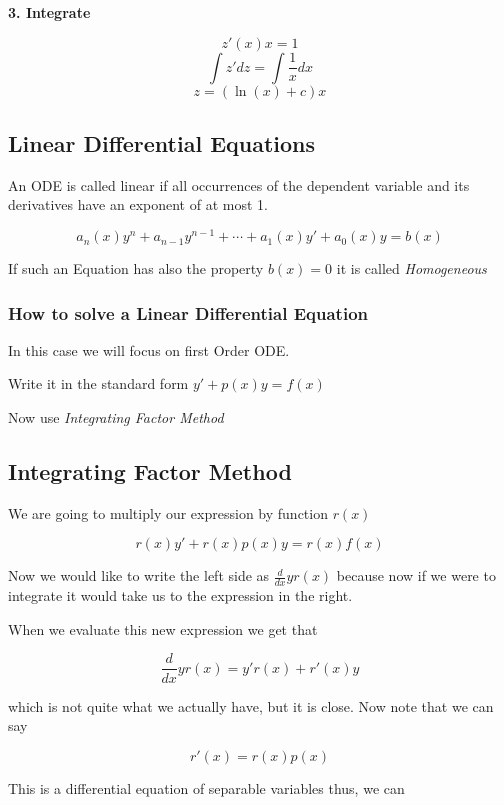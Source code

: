 \textbf{3. Integrate}

\[
    z'(x)x = 1
\]
\[
    \int z' dz = \int \frac{1}{x} dx
\]
\[
    z = (\ln(x) + c)x
\]

\subsection{Linear Differential Equations}

An ODE is called linear if all occurrences of the dependent variable and its
derivatives have an exponent of at most 1.

\[
    a_n(x)y^n + a_{n - 1}y^{n -1} + \cdots + a_1(x)y' + a_0(x)y = b(x)
\]

If such an Equation has also the property \(b(x) = 0\) it is called \emph{Homogeneous}

\subsubsection{How to solve a Linear Differential Equation}

In this case we will focus on first Order ODE\@.
\vspace{\baselineskip}

Write it in the standard form \(y' + p(x)y = f(x)\)
\vspace{\baselineskip}

Now use \emph{Integrating Factor Method}

\subsection{Integrating Factor Method}

We are going to multiply our expression by function \(r(x)\) 

\[
    r(x)y' + r(x)p(x)y = r(x)f(x)
\]

Now we would like to write the left side as \(\frac{d}{dx} y r(x)\) because now if we
were to integrate it would take us to the expression in the right.
\vspace{\baselineskip}

When we evaluate this new expression we get that

\[
    \frac{d}{dx} y r(x) = y'r(x) + r'(x)y
\]

which is not quite what we actually have, but it is close. Now note that we can say

\[
    r'(x) = r(x)p(x)
\]

This is a differential equation of separable variables thus, we can

